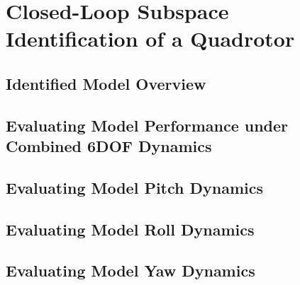 \chapter{Closed-Loop Subspace Identification of a Quadrotor}

\section{Identified Model Overview}


\section{Evaluating Model Performance under Combined 6DOF Dynamics}


\section{Evaluating Model Pitch Dynamics}


\section{Evaluating Model Roll Dynamics}


\section{Evaluating Model Yaw Dynamics}



